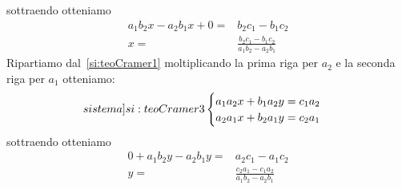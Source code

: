 sottraendo otteniamo
\begin{align*}
a_1b_2x-a_2b_1x+0=&b_2c_1-b_1c_2\\
x=&\frac{b_2c_1-b_1c_2}{a_1b_2-a_2b_1}
\end{align*}
Ripartiamo dal~\cref{si:teoCramer1} moltiplicando la prima riga per $a_2$ e la seconda riga per $a_1$ otteniamo:
\begin{equation}\label[sistema]{si:teoCramer3}
\begin{cases}
a_1a_2x+b_1a_2y=c_1a_2\\
a_2a_1x+b_2a_1y=c_2a_1
\end{cases}
\end{equation}
sottraendo otteniamo
\begin{align*}
0+a_1b_2y-a_2b_1y=&a_2c_1-a_1c_2\\
y=&\frac{c_2a_1-c_1a_2}{a_1b_2-a_2b_1}
\end{align*}